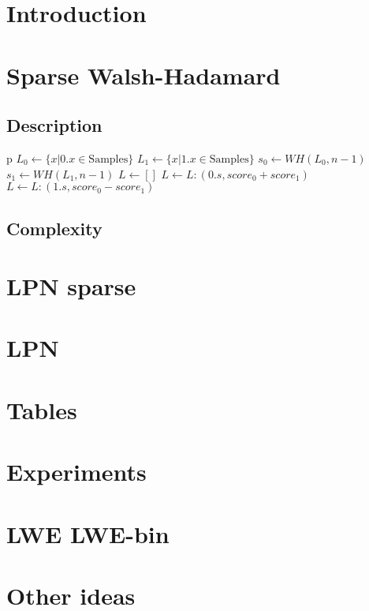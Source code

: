 \documentclass{article}		%
\begin{document}
\title{}
\author{}
\date\today

\maketitle
\section{Introduction}
\section{Sparse Walsh-Hadamard}
\subsection{Description}


\begin{algorithmic}
\State p
   \EndIf
\State $L_0 \gets \{x | 0.x \in \text{Samples} \}$
\State $L_1 \gets \{x | 1.x \in \text{Samples} \}$
\State $s_0 \gets WH(L_0,n-1)$ 
\State $s_1 \gets WH(L_1,n-1)$
\State$ L \gets []$
  \State $ L\gets L:(0.s, score_0 + score_1)    $
   $L\gets L: (1.s ,  score_0 - score_1)  $ \EndIf 
\EndFor
{}
\EndFunction
\end{algorithmic}

\subsection{Complexity}
\section{LPN sparse}
\section{LPN}
\section{Tables}
\section{Experiments}
\section{LWE LWE-bin}
\section{Other ideas}
\end{document}
